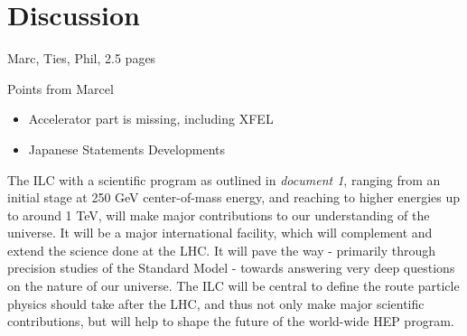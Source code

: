\documentclass[%
 reprint,
 amsmath,amssymb,
 aps,
]{revtex4-1}
\begin{document}

\section{\label{sec:discussion}Discussion}

Marc, Ties, Phil, 2.5 pages

Points from Marcel
\begin{itemize}
    \item Accelerator part is missing, including XFEL
    \item Japanese Statements Developments
\end{itemize}





The ILC with a scientific program as outlined in {\it document 1}, ranging from an initial stage at 250 GeV center-of-mass energy, and reaching to higher energies up to around 1 TeV, will make major contributions to our understanding of the universe. It will be a major international facility, which will complement and extend the science done at the LHC. It will pave the way - primarily through precision studies of the Standard Model - towards answering very deep questions on the nature of our universe. The ILC will be central to define the route particle physics should take after the LHC, and thus not only make major scientific contributions, but will help to shape the future of the world-wide HEP program. 
\end{document}
